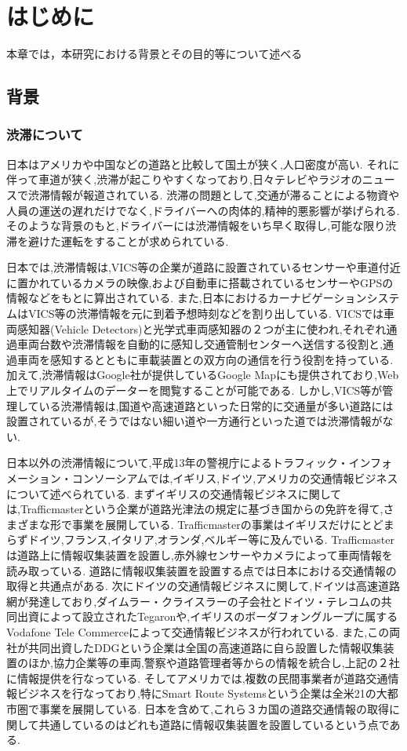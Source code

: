 \chapter{はじめに}
本章では，本研究における背景とその目的等について述べる
\section{背景}
\subsection{渋滞について}
日本はアメリカや中国などの道路と比較して国土が狭く,人口密度が高い.
それに伴って車道が狭く,渋滞が起こりやすくなっており,日々テレビやラジオのニュースで渋滞情報が報道されている.
渋滞の問題として,交通が滞ることによる物資や人員の運送の遅れだけでなく,ドライバーへの肉体的,精神的悪影響が挙げられる.
そのような背景のもと,ドライバーには渋滞情報をいち早く取得し,可能な限り渋滞を避けた運転をすることが求められている.

日本では,渋滞情報は,VICS等の企業が道路に設置されているセンサーや車道付近に置かれているカメラの映像,および自動車に搭載されているセンサーやGPSの情報などをもとに算出されている.
また,日本におけるカーナビゲーションシステムはVICS等の渋滞情報を元に到着予想時刻などを割り出している.
VICSでは車両感知器(Vehicle Detectors)と光学式車両感知器の２つが主に使われ,それぞれ通過車両台数や渋滞情報を自動的に感知し交通管制センターへ送信する役割と,通過車両を感知するとともに車載装置との双方向の通信を行う役割を持っている.
加えて,渋滞情報はGoogle社が提供しているGoogle Mapにも提供されており,Web上でリアルタイムのデーターを閲覧することが可能である.
しかし,VICS等が管理している渋滞情報は,国道や高速道路といった日常的に交通量が多い道路には設置されているが,そうではない細い道や一方通行といった道では渋滞情報がない.

日本以外の渋滞情報について,平成13年の警視庁によるトラフィック・インフォメーション・コンソーシアムでは,イギリス,ドイツ,アメリカの交通情報ビジネスについて述べられている\cite{traffic_buisiness}.
まずイギリスの交通情報ビジネスに関しては,Trafficmasterという企業が道路光津法の規定に基づき国からの免許を得て,さまざまな形で事業を展開している.
Trafficmasterの事業はイギリスだけにとどまらずドイツ,フランス,イタリア,オランダ,ベルギー等に及んでいる.
Trafficmasterは道路上に情報収集装置を設置し,赤外線センサーやカメラによって車両情報を読み取っている.
道路に情報収集装置を設置する点では日本における交通情報の取得と共通点がある.
次にドイツの交通情報ビジネスに関して,ドイツは高速道路網が発達しており,ダイムラー・クライスラーの子会社とドイツ・テレコムの共同出資によって設立されたTegaronや,イギリスのボーダフォングループに属するVodafone Tele Commerceによって交通情報ビジネスが行われている.
また,この両社が共同出資したDDGという企業は全国の高速道路に自ら設置した情報収集装置のほか,協力企業等の車両,警察や道路管理者等からの情報を統合し,上記の２社に情報提供を行なっている.
そしてアメリカでは,複数の民間事業者が道路交通情報ビジネスを行なっており,特にSmart Route Systemsという企業は全米21の大都市圏で事業を展開している.
日本を含めて,これら３カ国の道路交通情報の取得に関して共通しているのはどれも道路に情報収集装置を設置しているという点である.

